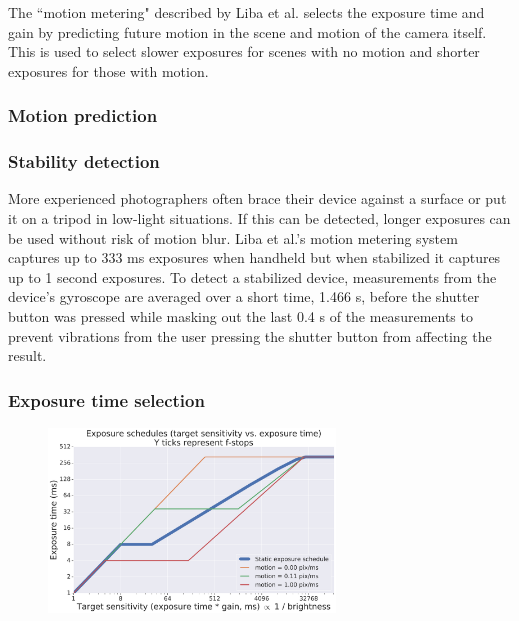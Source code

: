 \documentclass{sig-alternate}
\begin{document}
The ``motion metering" described by Liba et al. selects the exposure time and gain by predicting future motion in the scene and motion of the camera itself. This is used to select slower exposures for scenes with no motion and shorter exposures for those with motion.

\subsubsection{Motion prediction}

\subsubsection{Stability detection}

More experienced photographers often brace their device against a surface or put it on a tripod in low-light situations. If this can be detected, longer exposures can be used without risk of motion blur. Liba et al.'s motion metering system captures up to 333 ms exposures when handheld but when stabilized it captures up to 1 second exposures. To detect a stabilized device, measurements from the device's gyroscope are averaged over a short time, 1.466 s, before the shutter button was pressed while masking out the last 0.4 s of the measurements to prevent vibrations from the user pressing the shutter button from affecting the result.

\subsubsection{Exposure time selection}

\begin{figure}
\centering
\includegraphics[width=3in]{figures/liba2019-figure-7.pdf}
\caption{ \cite{Liba2019}}
\label{fig:BayerPattern}


\end{figure}
\end{document}
